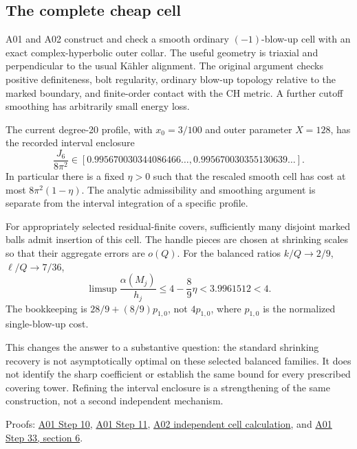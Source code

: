 \documentclass[
]{article}
\begin{document}
\hypertarget{the-complete-cheap-cell}{%
\subsection{The complete cheap cell}\label{the-complete-cheap-cell}}

A01 and A02 construct and check a smooth ordinary \((-1)\)-blow-up cell
with an exact complex-hyperbolic outer collar. The useful geometry is
triaxial and perpendicular to the usual Kähler alignment. The original
argument checks positive definiteness, bolt regularity, ordinary blow-up
topology relative to the marked boundary, and finite-order contact with
the CH metric. A further cutoff smoothing has arbitrarily small energy
loss.

The current degree-20 profile, with \(x_0=3/100\) and outer parameter
\(X=128\), has the recorded interval enclosure \[
 \frac{J_6}{8\pi^2}
 \in[0.995670030344086466\ldots,
       0.995670030355130639\ldots].
\] In particular there is a fixed \(\eta>0\) such that the rescaled
smooth cell has cost at most \(8\pi^2(1-\eta)\). The analytic
admissibility and smoothing argument is separate from the interval
integration of a specific profile.

For appropriately selected residual-finite covers, sufficiently many
disjoint marked balls admit insertion of this cell. The handle pieces
are chosen at shrinking scales so that their aggregate errors are
\(o(Q)\). For the balanced ratios \(k/Q\to2/9\), \(\ell/Q\to7/36\), \[
 \limsup\frac{\alpha(M_j)}{h_j}
 \le 4-\frac89\eta<3.9961512<4.
\] The bookkeeping is \(28/9+(8/9)p_{1,0}\), not \(4p_{1,0}\), where
\(p_{1,0}\) is the normalized single-blow-up cost.

This changes the answer to a substantive question: the standard
shrinking recovery is not asymptotically optimal on these selected
balanced families. It does not identify the sharp coefficient or
establish the same bound for every prescribed covering tower. Refining
the interval enclosure is a strengthening of the same construction, not
a second independent mechanism.

Proofs:
\href{sources/Sessions/S1003A01/workspace/notes/step10_rigorous_subthreshold_cell_and_O11.md}{A01
Step 10},
\href{sources/Sessions/S1003A01/workspace/notes/step11_independent_review_O11_and_mixed_cost.md}{A01
Step 11},
\href{sources/Sessions/S1003A02/workspace/notes/step11_subthreshold_perpendicular_cell.md}{A02
independent cell calculation}, and
\href{sources/Sessions/S1003A01/workspace/notes/step33_surgery_slope_law_and_ASD_retention.md}{A01
Step 33, section 6}.
\end{document}
